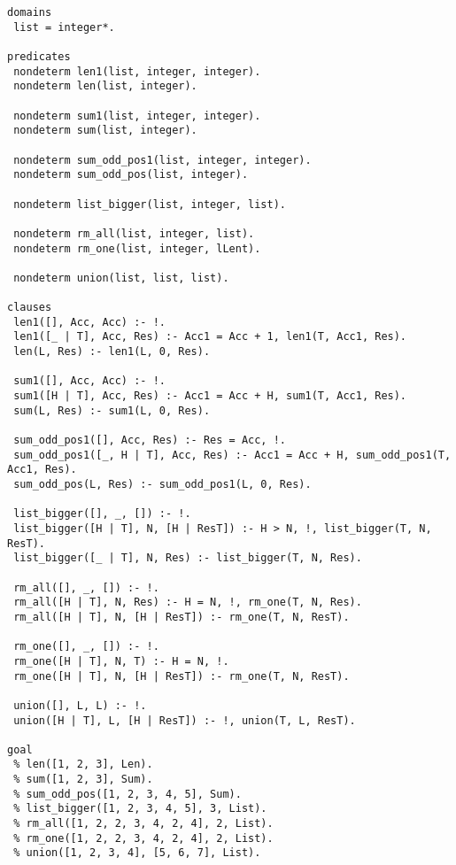 \begin{lstlisting}[label=div,caption=Реализация программы на языке Prolog]
domains 
 list = integer*.

predicates
 nondeterm len1(list, integer, integer).
 nondeterm len(list, integer).
 
 nondeterm sum1(list, integer, integer).
 nondeterm sum(list, integer).
 
 nondeterm sum_odd_pos1(list, integer, integer).
 nondeterm sum_odd_pos(list, integer).
 
 nondeterm list_bigger(list, integer, list).
 
 nondeterm rm_all(list, integer, list).
 nondeterm rm_one(list, integer, lLent).
 
 nondeterm union(list, list, list).
 
clauses
 len1([], Acc, Acc) :- !.
 len1([_ | T], Acc, Res) :- Acc1 = Acc + 1, len1(T, Acc1, Res).
 len(L, Res) :- len1(L, 0, Res).
 
 sum1([], Acc, Acc) :- !.
 sum1([H | T], Acc, Res) :- Acc1 = Acc + H, sum1(T, Acc1, Res).
 sum(L, Res) :- sum1(L, 0, Res).
 
 sum_odd_pos1([], Acc, Res) :- Res = Acc, !.
 sum_odd_pos1([_, H | T], Acc, Res) :- Acc1 = Acc + H, sum_odd_pos1(T, Acc1, Res).
 sum_odd_pos(L, Res) :- sum_odd_pos1(L, 0, Res).
 
 list_bigger([], _, []) :- !.
 list_bigger([H | T], N, [H | ResT]) :- H > N, !, list_bigger(T, N, ResT).
 list_bigger([_ | T], N, Res) :- list_bigger(T, N, Res).
 
 rm_all([], _, []) :- !.
 rm_all([H | T], N, Res) :- H = N, !, rm_one(T, N, Res).
 rm_all([H | T], N, [H | ResT]) :- rm_one(T, N, ResT).
 
 rm_one([], _, []) :- !.
 rm_one([H | T], N, T) :- H = N, !.
 rm_one([H | T], N, [H | ResT]) :- rm_one(T, N, ResT).
 
 union([], L, L) :- !.
 union([H | T], L, [H | ResT]) :- !, union(T, L, ResT).

goal
 % len([1, 2, 3], Len).
 % sum([1, 2, 3], Sum).
 % sum_odd_pos([1, 2, 3, 4, 5], Sum).
 % list_bigger([1, 2, 3, 4, 5], 3, List).
 % rm_all([1, 2, 2, 3, 4, 2, 4], 2, List).
 % rm_one([1, 2, 2, 3, 4, 2, 4], 2, List).
 % union([1, 2, 3, 4], [5, 6, 7], List).
\end{lstlisting}

\newpage

\newcommand{\specialcell}[2][c]{%
  \begin{tabular}[#1]{@{}l@{}}#2\end{tabular}}
  
